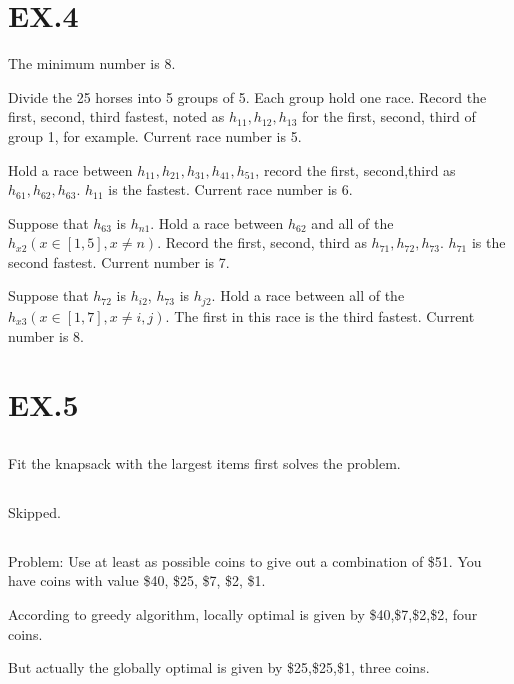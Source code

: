 \documentclass[12pt,a4paper]{article}
\theoremstyle{definition}
\begin{document}
\section{EX.4}
    \par The minimum number is 8.
    \par Divide the 25 horses into 5 groups of 5. Each group hold one race. Record the first, second, third fastest, noted as $h_{11},h_{12},h_{13}$ for the first, second, third of group 1, for example. Current race number is 5.
    \par Hold a race between $h_{11},h_{21},h_{31},h_{41},h_{51}$, record the first, second,third as $h_{61},h_{62},h_{63}$. $h_{11}$ is the fastest. Current race number is 6.
    \par Suppose that $h_{63}$ is $h_{n1}$. Hold a race between $h_{62}$ and all of the $h_{x2}(x\in[1,5],x\neq n)$. Record the first, second, third as $h_{71},h_{72},h_{73}$. $h_{71}$ is the second fastest. Current number is 7.
    \par \par Suppose that $h_{72}$ is $h_{i2}$, $h_{73}$ is $h_{j2}$. Hold a race between all of the $h_{x3}(x\in[1,7],x\neq i,j)$. The first in this race is the third fastest. Current number is 8.
    
\section{EX.5}
\subsection{}
    \par Fit the knapsack with the largest items first solves the problem.
\subsection{}
    \par Skipped.
\subsection{}
    \par Problem: Use at least as possible coins to give out a combination of \$51. You have coins with value \$40, \$25, \$7, \$2, \$1.
    \par According to greedy algorithm, locally optimal is given by \$40,\$7,\$2,\$2, four coins.
    \par But actually the globally optimal is given by \$25,\$25,\$1, three coins.
\end{document}
